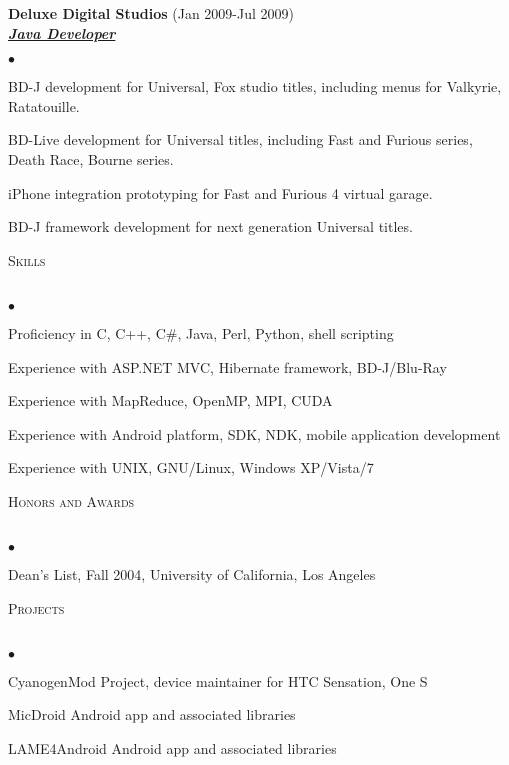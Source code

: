 \documentclass{article}
\newcommand{\lineunder}{\vspace*{-8pt} \\ \hspace*{-18pt} \hrulefill \\}
\newcommand{\header}[1]{{\hspace*{-15pt}\vspace*{6pt} \textsc{#1}} \vspace*{-6pt} \lineunder}
\newcommand{\employer}[3]{{ \textbf{#1} (#2)\\ \underline{\textbf{\emph{#3}}}\\  }}
\newenvironment{achievements}{\begin{list}{$\bullet$}{\topsep 0pt \itemsep -2pt}}{\vspace*{4pt}\end{list}}
\begin{document}
\employer{Deluxe Digital Studios}{Jan 2009-Jul 2009}{Java Developer}
  \begin{achievements}
    \item BD-J development for Universal, Fox studio titles, including menus for Valkyrie, Ratatouille.
    \item BD-Live development for Universal titles, including Fast and Furious series, Death Race, Bourne series.
    \item iPhone integration prototyping for Fast and Furious 4 virtual garage.
    \item BD-J framework development for next generation Universal titles.
  \end{achievements}

\header{Skills}
  \begin{achievements}
    \item Proficiency in C, C++, C\#, Java, Perl, Python, shell scripting
    \item Experience with ASP.NET MVC, Hibernate framework, BD-J/Blu-Ray
    \item Experience with MapReduce, OpenMP, MPI, CUDA
    \item Experience with Android platform, SDK, NDK, mobile application development
    \item Experience with UNIX, GNU/Linux, Windows XP/Vista/7
  \end{achievements}

\header{Honors and Awards}
  \begin{achievements}
    \item Dean's List, Fall 2004, University of California, Los Angeles
  \end{achievements}

\header{Projects}
  \begin{achievements}
    \item CyanogenMod Project, device maintainer for HTC Sensation, One S
    \item MicDroid Android app and associated libraries
    \item LAME4Android Android app and associated libraries
  \end{achievements}
\end{document}
